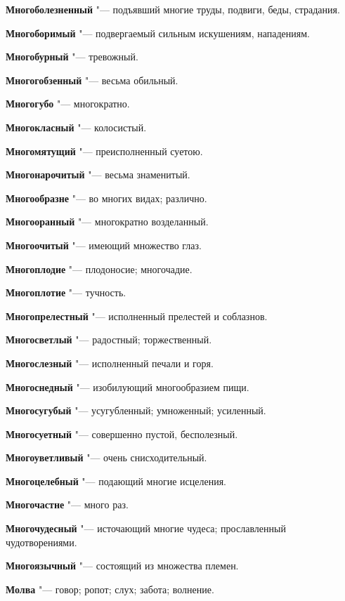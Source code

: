 \begin{mymulticols}
\noindent\textbf{Многоболезненный} "--- подъявший многие труды, подвиги, беды, страдания. 

\noindent\textbf{Многоборимый} "--- подвергаемый сильным искушениям, нападениям. 

\noindent\textbf{Многобурный} "--- тревожный. 

\noindent\textbf{Многогобзенный} "--- весьма обильный. 

\noindent\textbf{Многогубо} "--- многократно. 

\noindent\textbf{Многокласный} "--- колосистый. 

\noindent\textbf{Многомятущий} "--- преисполненный суетою. 

\noindent\textbf{Многонарочитый} "--- весьма знаменитый. 

\noindent\textbf{Многообразне} "--- во многих видах; различно. 

\noindent\textbf{Многооранный} "--- многократно возделанный. 

\noindent\textbf{Многоочитый} "--- имеющий множество глаз. 

\noindent\textbf{Многоплодие} "--- плодоносие; многочадие. 

\noindent\textbf{Многоплотие} "--- тучность. 

\noindent\textbf{Многопрелестный} "--- исполненный прелестей и соблазнов. 

\noindent\textbf{Многосветлый} "--- радостный; торжественный. 

\noindent\textbf{Многослезный} "--- исполненный печали и горя. 

\noindent\textbf{Многоснедный} "--- изобилующий многообразием пищи. 

\noindent\textbf{Многосугубый} "--- усугубленный; умноженный; усиленный. 

\noindent\textbf{Многосуетный} "--- совершенно пустой, бесполезный. 

\noindent\textbf{Многоуветливый} "--- очень снисходительный. 

\noindent\textbf{Многоцелебный} "--- подающий многие исцеления. 

\noindent\textbf{Многочастне} "--- много раз. 

\noindent\textbf{Многочудесный} "--- источающий многие чудеса; прославленный чудотворениями. 

\noindent\textbf{Многоязычный} "--- состоящий из множества племен. 

\noindent\textbf{Молва} "--- говор; ропот; слух; забота; волнение. 


\end{mymulticols}
